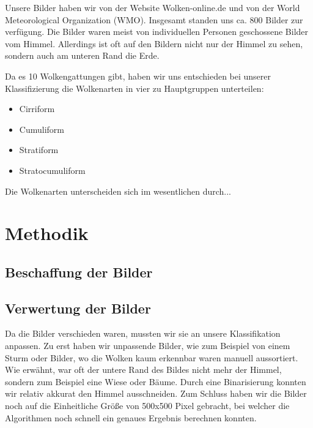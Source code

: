 \documentclass[a4,german]{article}
\begin{document}

Unsere Bilder haben wir von der Website Wolken-online.de und von der World Meteorological Organization (WMO).
Insgesamt standen uns ca. 800 Bilder zur verfügung.
Die Bilder waren meist von individuellen Personen geschossene Bilder vom Himmel. 
Allerdings ist oft auf den Bildern nicht nur der Himmel zu sehen, sondern auch am unteren Rand die Erde.

Da es 10 Wolkengattungen gibt, haben wir uns entschieden bei unserer Klassifizierung 
die Wolkenarten in vier zu Hauptgruppen unterteilen: 
\begin{itemize}
\item Cirriform
\item Cumuliform
\item Stratiform
\item Stratocumuliform
\end{itemize}

Die Wolkenarten unterscheiden sich im wesentlichen durch...

\section{Methodik}


\subsection{Beschaffung der Bilder}

\subsection{Verwertung der Bilder}
Da die Bilder verschieden waren, mussten wir sie an unsere Klassifikation anpassen.
Zu erst haben wir unpassende Bilder, wie zum Beispiel von einem Sturm oder Bilder, wo die Wolken kaum erkennbar waren manuell aussortiert.
Wie erwähnt, war oft der untere Rand des Bildes nicht mehr der Himmel, sondern zum Beispiel eine Wiese oder Bäume.
Durch eine Binarisierung konnten wir relativ akkurat den Himmel ausschneiden.
Zum Schluss haben wir die Bilder noch auf die Einheitliche Größe von 500x500 Pixel gebracht, bei welcher die Algorithmen noch schnell ein genaues Ergebnis berechnen konnten. 
\end{document}

